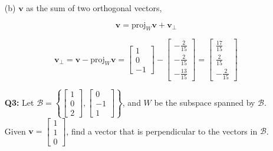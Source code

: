 \documentclass[a4paper,11pt,reqno]{amsart}
\numberwithin{equation}{section}
\begin{document}
\begin{enumerate}
\begin{center}
{{    (b) \(\mathbf{v}\) as the sum of two orthogonal vectors,
    
    \[
    \mathbf{v} = \text{proj}_{W} \mathbf{v} + \mathbf{v}_{\perp}
    \]
    
    \[
    \mathbf{v}_{\perp} = \mathbf{v} - \text{proj}_{W} \mathbf{v} 
    = \begin{bmatrix} 1 \\ 0 \\ -1 \end{bmatrix} - \begin{bmatrix} -\frac{2}{15} \\ -\frac{2}{15} \\ -\frac{13}{15} \end{bmatrix}
    = \begin{bmatrix} \frac{17}{15} \\ \frac{2}{15} \\ -\frac{2}{15} \end{bmatrix}
    \]
    }}
    \end{center}
    
    \item[\textbf{Q3:}] Let \(\mathcal{B} =\left\{\begin{bmatrix} 1 \\ 0 \\ 2 \end{bmatrix}, \begin{bmatrix} 0 \\ -1 \\ 1 \end{bmatrix} \right\}\), and \(W\) be the subspace spanned by \(\mathcal{B}\).
    Given \(\mathbf{v} = \begin{bmatrix} 1 \\ 1 \\ 0 \end{bmatrix}\), find a vector that is perpendicular to the vectors in \(\mathcal{B}\).

    \begin{center}\setlength{\fboxsep}{10pt}
\end{center}
\end{enumerate}
\end{document}
